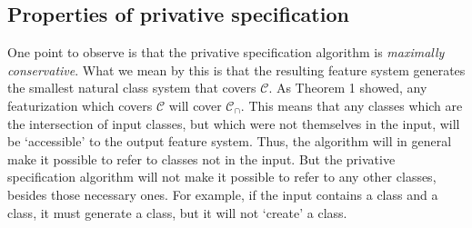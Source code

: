 \documentclass[11pt, oneside]{article}   	%
\begin{document}
\subsection{Properties of privative specification}

\vspace{\baselineskip} One point to observe is that the privative specification algorithm is \textit{maximally conservative}. What we mean by this is that the resulting feature system generates the smallest natural class system that covers $\mathcal C$. As Theorem 1 showed, any featurization which covers $\mathcal C$ will cover $\mathcal C_\cap$. This means that any classes which are the intersection of input classes, but which were not themselves in the input, will be `accessible' to the output feature system. Thus, the algorithm will in general make it possible to refer to classes not in the input. But the privative specification algorithm will not make it possible to refer to any other classes, besides those necessary ones. For example, if the input contains a  class and a  class, it must generate a  class, but it will not `create' a  class.
\end{document}
